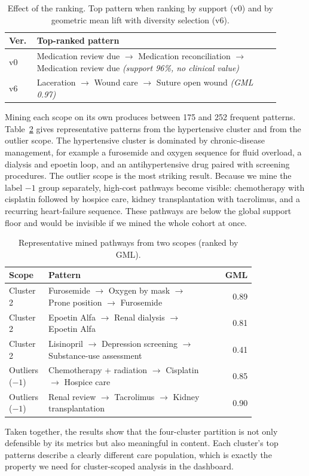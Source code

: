 \begin{table}[t]
\caption{Effect of the ranking. Top pattern when ranking by support (v0) and by geometric mean lift with diversity selection (v6).}
\label{tab:ablation}
\centering
\small
\begin{tabular}{@{}p{0.08\linewidth}p{0.82\linewidth}@{}}
\toprule
Ver. & Top-ranked pattern \\
\midrule
v0 & Medication review due $\rightarrow$ Medication reconciliation $\rightarrow$ Medication review due \emph{(support 96\%, no clinical value)} \\[2pt]
v6 & Laceration $\rightarrow$ Wound care $\rightarrow$ Suture open wound \emph{(GML 0.97)} \\
\bottomrule
\end{tabular}
\end{table}

Mining each scope on its own produces between 175 and 252 frequent patterns. Table~\ref{tab:patterns} gives representative patterns from the hypertensive cluster and from the outlier scope. The hypertensive cluster is dominated by chronic-disease management, for example a furosemide and oxygen sequence for fluid overload, a dialysis and epoetin loop, and an antihypertensive drug paired with screening procedures. The outlier scope is the most striking result. Because we mine the label $-1$ group separately, high-cost pathways become visible: chemotherapy with cisplatin followed by hospice care, kidney transplantation with tacrolimus, and a recurring heart-failure sequence. These pathways are below the global support floor and would be invisible if we mined the whole cohort at once.

\begin{table}[t]
\caption{Representative mined pathways from two scopes (ranked by GML).}
\label{tab:patterns}
\centering
\small
\begin{tabular}{@{}p{0.16\linewidth}p{0.66\linewidth}r@{}}
\toprule
Scope & Pattern & GML \\
\midrule
Cluster 2 & Furosemide $\rightarrow$ Oxygen by mask $\rightarrow$ Prone position $\rightarrow$ Furosemide & 0.89 \\
Cluster 2 & Epoetin Alfa $\rightarrow$ Renal dialysis $\rightarrow$ Epoetin Alfa & 0.81 \\
Cluster 2 & Lisinopril $\rightarrow$ Depression screening $\rightarrow$ Substance-use assessment & 0.41 \\
Outliers ($-1$) & Chemotherapy + radiation $\rightarrow$ Cisplatin $\rightarrow$ Hospice care & 0.85 \\
Outliers ($-1$) & Renal review $\rightarrow$ Tacrolimus $\rightarrow$ Kidney transplantation & 0.90 \\
\bottomrule
\end{tabular}
\end{table}

Taken together, the results show that the four-cluster partition is not only defensible by its metrics but also meaningful in content. Each cluster's top patterns describe a clearly different care population, which is exactly the property we need for cluster-scoped analysis in the dashboard.
